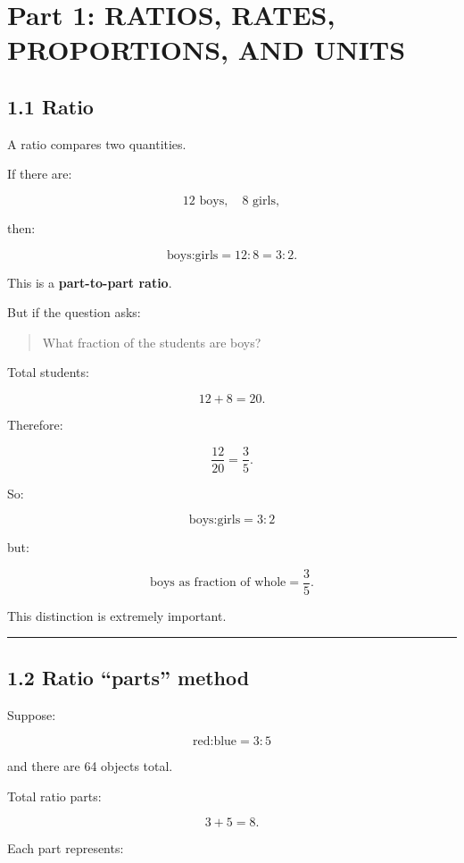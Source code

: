 \documentclass[
]{article}
\begin{document}
\section{Part 1: RATIOS, RATES, PROPORTIONS, AND
UNITS}\label{part-1-ratios-rates-proportions-and-units}

\subsection{1.1 Ratio}\label{ratio}

A ratio compares two quantities.

If there are:

\[
12\text{ boys},\quad 8\text{ girls},
\]

then:

\[
\text{boys:girls}=12:8=3:2.
\]

This is a \textbf{part-to-part ratio}.

But if the question asks:

\begin{quote}
What fraction of the students are boys?
\end{quote}

Total students:

\[
12+8=20.
\]

Therefore:

\[
\frac{12}{20}=\frac35.
\]

So:

\[
\boxed{\text{boys:girls}=3:2}
\]

but:

\[
\boxed{\text{boys as fraction of whole}=\frac35}.
\]

This distinction is extremely important.

\begin{center}\rule{0.5\linewidth}{0.5pt}\end{center}

\subsection{1.2 Ratio ``parts'' method}\label{ratio-parts-method}

Suppose:

\[
\text{red:blue}=3:5
\]

and there are 64 objects total.

Total ratio parts:

\[
3+5=8.
\]

Each part represents:
\end{document}
